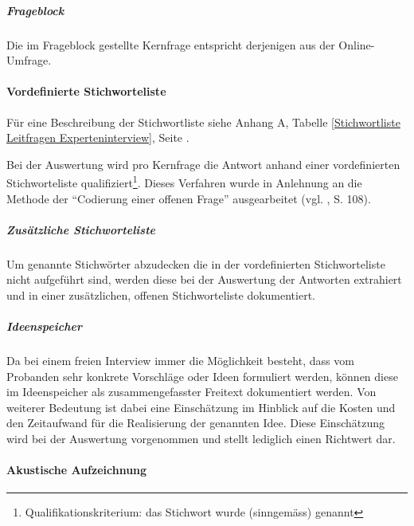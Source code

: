 \documentclass[../../main.tex]{subfiles}
\begin{document}
\subparagraph*{Frageblock}\mbox{}

\begin{sloppypar}
Die im Frageblock gestellte Kernfrage entspricht derjenigen aus der Online-Umfrage.
\end{sloppypar}

\paragraph*{Vordefinierte Stichworteliste}\mbox{}

\begin{sloppypar}
Für eine Beschreibung der Stichwortliste  siehe Anhang A, Tabelle  \ref{Stichwortliste Leitfragen Experteninterview}, Seite \pageref{Stichwortliste Leitfragen Experteninterview}.

Bei der Auswertung wird pro Kernfrage die Antwort anhand einer vordefinierten Stichworteliste qualifiziert\footnote{Qualifikationskriterium: das Stichwort wurde (sinngemäss) genannt}. Dieses Verfahren wurde in Anlehnung an die Methode der "`Codierung einer offenen Frage"' ausgearbeitet (vgl. \citeauthor{mayer_interview_2013} \citeyear{mayer_interview_2013}, S. 108).
\end{sloppypar}

\subparagraph*{Zusätzliche Stichworteliste}\mbox{}

\begin{sloppypar}
Um genannte Stichwörter abzudecken die in der vordefinierten Stichworteliste nicht aufgeführt sind, werden diese bei der Auswertung der Antworten extrahiert und in einer zusätzlichen, offenen Stichworteliste dokumentiert.
\end{sloppypar}

\subparagraph*{Ideenspeicher}\mbox{}

\begin{sloppypar}
Da bei einem freien Interview immer die Möglichkeit besteht, dass vom Probanden sehr konkrete Vorschläge oder Ideen formuliert werden, können diese im Ideenspeicher als zusammengefasster Freitext dokumentiert werden. Von weiterer Bedeutung ist dabei eine Einschätzung im Hinblick auf die Kosten und den Zeitaufwand für die Realisierung der genannten Idee. Diese Einschätzung wird bei der Auswertung vorgenommen und stellt lediglich einen Richtwert dar. 
\end{sloppypar}

\paragraph*{Akustische Aufzeichnung}\mbox{}
\end{document}
